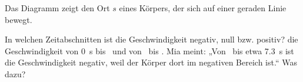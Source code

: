 Das Diagramm zeigt den Ort $s$ eines Körpers, der sich auf einer geraden Linie bewegt.
\begin{center}
\end{center}
\begin{abcliste}
\abc In welchen Zeitabschnitten ist die Geschwindigkeit negativ, null bzw. positiv?
\abc {} die Geschwindigkeit von \SI{0}{\second} bis \tOneO\ und von \tTwoO\ bis \tEndO.
\abc Mia meint: „Von \tTwoO\ bis etwa \SI{7.3}{\second} ist die Geschwindigkeit negativ, weil der Körper dort im negativen Bereich ist.“ Was  dazu?
\end{abcliste}
